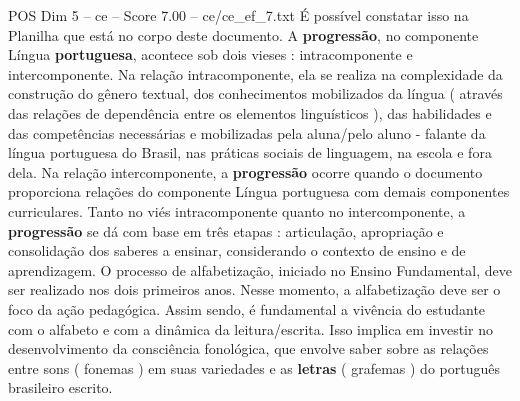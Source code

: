\begin{textsample}{POS Dim 5 – ce – Score 7.00 – ce/ce\_ef\_7.txt}
É possível constatar isso na Planilha que está no corpo deste documento.
A \textbf{progressão}, no componente Língua \textbf{portuguesa}, acontece sob dois vieses : intracomponente e intercomponente.
Na relação intracomponente, ela se realiza na complexidade da construção do gênero textual, dos conhecimentos mobilizados da língua ( através das relações de dependência entre os elementos linguísticos ), das habilidades e das competências necessárias e mobilizadas pela aluna/pelo aluno - falante da língua portuguesa do Brasil, nas práticas sociais de linguagem, na escola e fora dela.
Na relação intercomponente, a \textbf{progressão} ocorre quando o documento proporciona relações do componente Língua portuguesa com demais componentes curriculares.
Tanto no viés intracomponente quanto no intercomponente, a \textbf{progressão} se dá com base em três etapas : articulação, apropriação e consolidação dos saberes a ensinar, considerando o contexto de ensino e de aprendizagem.
O processo de alfabetização, iniciado no Ensino Fundamental, deve ser realizado nos dois primeiros anos.
Nesse momento, a alfabetização deve ser o foco da ação pedagógica.
Assim sendo, é fundamental a vivência do estudante com o alfabeto e com a dinâmica da leitura/escrita.
Isso implica em investir no desenvolvimento da consciência fonológica, que envolve saber sobre as relações entre sons ( fonemas ) em suas variedades e as \textbf{letras} ( grafemas ) do português brasileiro escrito.

\end{textsample}
